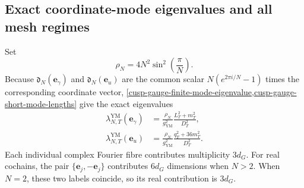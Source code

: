 \subsection{Exact coordinate-mode eigenvalues and all mesh regimes}
\label{cusp-gauge-finite-limits-subsection}

Set
\begin{equation}
 \rho_N=4N^2\sin^2\left(\frac\pi N\right).
 \label{cusp-gauge-finite-rho}
\end{equation}
Because \(\mathfrak d_N(\mathbf e_\gamma)\) and \(\mathfrak d_N(\mathbf e_u)\) are the common
scalar \(N(e^{2\pi i/N}-1)\) times the corresponding coordinate vector,
\cref{cusp-gauge-finite-mode-eigenvalue,cusp-gauge-short-mode-lengths}
give the exact eigenvalues
\begin{align}
 \lambda_{N,T}^{\mathrm{YM}}(\mathbf e_\gamma)
 &=\frac{\rho_N}{g_{\mathrm{YM}}^2}
   \frac{L_T^2+m_T^2}{D_T^2},
 \label{cusp-gauge-finite-gamma-eigenvalue}\\
 \lambda_{N,T}^{\mathrm{YM}}(\mathbf e_u)
 &=\frac{\rho_N}{g_{\mathrm{YM}}^2}
   \frac{q_T^2+36m_T^2}{D_T^2}.
 \label{cusp-gauge-finite-u-eigenvalue}
\end{align}
Each individual complex Fourier fibre contributes multiplicity \(3d_G\).
For real cochains, the pair
\(\{\mathbf e_j,-\mathbf e_j\}\) contributes \(6d_G\) dimensions when
\(N>2\).  When \(N=2\), these two labels coincide, so its real contribution
is \(3d_G\).

